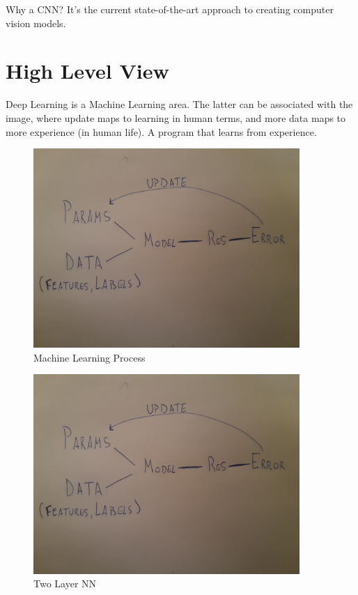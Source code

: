 Why a CNN? It's the current state-of-the-art approach to creating computer vision models.

\section{High Level View}
Deep Learning is a Machine Learning area. The latter can be associated with the image, where update maps to learning in human terms, and more data maps to more experience (in human life). A program that learns from experience.

\begin{figure}
 \centering
 \includegraphics[width=0.9\textwidth]{ML.jpg}
 \caption{Machine Learning Process}
\end{figure}


\begin{figure}
 \centering
 \includegraphics[width=0.9\textwidth]{ML.jpg}
 \caption{Two Layer NN}
\end{figure}

